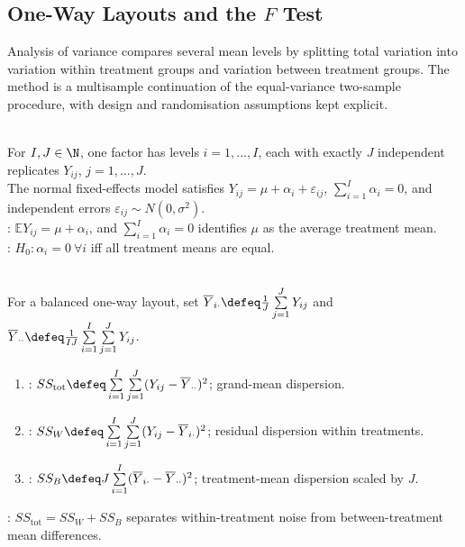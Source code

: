 \subsection{One-Way Layouts and the $F$ Test}

Analysis of variance compares several mean levels by splitting total variation into variation within treatment groups and variation between treatment groups.  The method is a multisample continuation of the equal-variance two-sample procedure, with design and randomisation assumptions kept explicit.

\begin{definition} \label{def:balanced-one-way-layout} \\
For $I,J\in\N$, one factor has levels $i=1,\ldots,I$, each with exactly $J$ independent replicates $Y_{ij}$, $j=1,\ldots,J$.\\
The normal fixed-effects model satisfies $Y_{ij}=\mu+\alpha_i+\varepsilon_{ij}$, $\sum\limits_{i=1}^{I}\alpha_i=0$, and independent errors $\varepsilon_{ij}\sim N(0,\sigma^2)$.\\
: $\mathbb{E}Y_{ij}=\mu+\alpha_i$, and $\sum\limits_{i=1}^{I}\alpha_i=0$ identifies $\mu$ as the average treatment mean.\\
: $H_0:\alpha_i=0\ \forall i$ iff all treatment means are equal.
\end{definition}

\begin{definition} \label{def:one-way-anova-sums-of-squares} \\
For a balanced one-way layout, set $\overline{Y}_{i\cdot}\defeq \frac1J\sum\limits_{j=1}^{J}Y_{ij}$ and $\overline{Y}_{\cdot\cdot}\defeq \frac{1}{IJ}\sum\limits_{i=1}^{I}\sum\limits_{j=1}^{J}Y_{ij}$.
\begin{enumerate}[label=(\roman*)]
\setlength{\itemsep}{0pt}
\item {}: $SS_{\mathrm{tot}}\defeq \sum\limits_{i=1}^{I}\sum\limits_{j=1}^{J}(Y_{ij}-\overline{Y}_{\cdot\cdot})^2$; grand-mean dispersion.
\item {}: $SS_W\defeq \sum\limits_{i=1}^{I}\sum\limits_{j=1}^{J}(Y_{ij}-\overline{Y}_{i\cdot})^2$; residual dispersion within treatments.
\item {}: $SS_B\defeq J\sum\limits_{i=1}^{I}(\overline{Y}_{i\cdot}-\overline{Y}_{\cdot\cdot})^2$; treatment-mean dispersion scaled by $J$.
\end{enumerate}
: $SS_{\mathrm{tot}}=SS_W+SS_B$ separates within-treatment noise from between-treatment mean differences.
\end{definition}

